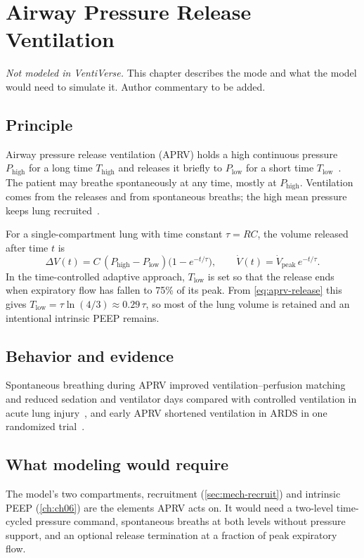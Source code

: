 \chapter{Airway Pressure Release Ventilation}
\label{ch:aprv}

\begin{authornote}
\emph{Not modeled in VentiVerse.} This chapter describes the mode and what the model would need to simulate it. Author commentary to be added.
\end{authornote}

\section{Principle}
Airway pressure release ventilation (APRV) holds a high continuous pressure $P_{\mathrm{high}}$ for a long time $T_{\mathrm{high}}$ and releases it briefly to $P_{\mathrm{low}}$ for a short time $T_{\mathrm{low}}$~\citep{stock1987}. The patient may breathe spontaneously at any time, mostly at $P_{\mathrm{high}}$. Ventilation comes from the releases and from spontaneous breaths; the high mean pressure keeps lung recruited~\citep{habashi2005}.

For a single-compartment lung with time constant $\tau=RC$, the volume released after time $t$ is
\begin{equation}
\Delta V(t)=C\,(P_{\mathrm{high}}-P_{\mathrm{low}})\bigl(1-e^{-t/\tau}\bigr),\qquad \dot V(t)=\dot V_{\mathrm{peak}}\,e^{-t/\tau}.
\label{eq:aprv-release}
\end{equation}
In the time-controlled adaptive approach, $T_{\mathrm{low}}$ is set so that the release ends when expiratory flow has fallen to 75\% of its peak. From \cref{eq:aprv-release} this gives $T_{\mathrm{low}}=\tau\ln(4/3)\approx0.29\,\tau$, so most of the lung volume is retained and an intentional intrinsic PEEP remains.

\section{Behavior and evidence}
Spontaneous breathing during APRV improved ventilation--perfusion matching and reduced sedation and ventilator days compared with controlled ventilation in acute lung injury~\citep{putensen2001}, and early APRV shortened ventilation in ARDS in one randomized trial~\citep{zhou2017}.

\section{What modeling would require}
The model's two compartments, recruitment (\cref{sec:mech-recruit}) and intrinsic PEEP (\cref{ch:ch06}) are the elements APRV acts on. It would need a two-level time-cycled pressure command, spontaneous breaths at both levels without pressure support, and an optional release termination at a fraction of peak expiratory flow.
